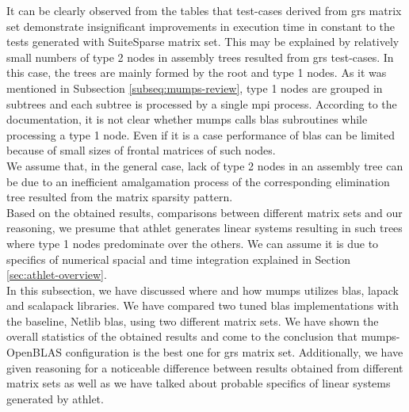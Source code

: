It can be clearly observed from the tables that test-cases derived from \acrshort{grs} matrix set demonstrate insignificant improvements in execution time in constant to the tests generated with SuiteSparse matrix set. This may be explained by relatively small numbers of type 2 nodes in assembly trees resulted from \acrshort{grs} test-cases. In this case, the trees are mainly formed by the root and type 1 nodes. As it was mentioned in Subsection \ref{subseq:mumps-review}, type 1 nodes are grouped in subtrees and each subtree is processed by a single \acrshort{mpi} process. According to the documentation, it is not clear whether \acrshort{mumps} calls \acrshort{blas} subroutines while processing a type 1 node. Even if it is a case performance of \acrshort{blas} can be limited because of small sizes of frontal matrices of such nodes.\\

We assume that, in the general case, lack of type 2 nodes in an assembly tree can be due to an inefficient amalgamation process of the corresponding elimination tree resulted from the matrix sparsity pattern.\\


Based on the obtained results, comparisons between different matrix sets and our reasoning, we presume that \acrshort{athlet} generates linear systems resulting in such trees where type 1 nodes predominate over the others. We can assume it is due to specifics of numerical spacial and time integration explained in Section \ref{sec:athlet-overview}.\\


In this subsection, we have discussed where and how \acrshort{mumps} utilizes \acrshort{blas}, \acrshort{lapack}  and \acrshort{scalapack} libraries. We have compared two tuned \acrshort{blas} implementations with the baseline, Netlib \acrshort{blas}, using two different matrix sets. We have shown the overall statistics of the obtained results and come to the conclusion that \acrshort{mumps}-OpenBLAS configuration is the best one for \acrshort{grs} matrix set. Additionally, we have given reasoning for a noticeable difference between results obtained from different matrix sets as well as we have talked about probable specifics of linear systems generated by \acrshort{athlet}.\\
